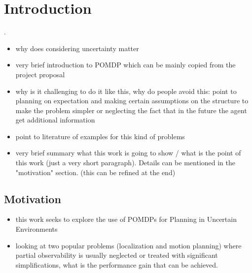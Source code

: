\chapter{Introduction}\label{chap:introduction}


.
\begin{itemize}
  \item why does considering uncertainty matter
  \item very brief introduction to POMDP which can be mainly copied from the project proposal
  \item why is it challenging to do it like this, why do people avoid this:
        point to planning on expectation and making certain assumptions on the structure to
        make the problem simpler or neglecting the fact that
        in the future the agent get additional information
  \item point to literature of examples for this kind of problems
  \item very brief summary what this work is going to show / what is the point
        of this work (just a very short paragraph). Details can be mentioned in the
        "motivation" section. (this can be refined at the end)
\end{itemize}

\section{Motivation}


\begin{itemize}
  \item this work seeks to explore the use of POMDPs for Planning in Uncertain Environments
  \item looking at two popular problems (localization and motion planning)
  where partial observability is usually neglected or treated with significant
  simplifications, what is the performance gain that can be achieved.
\end{itemize}


